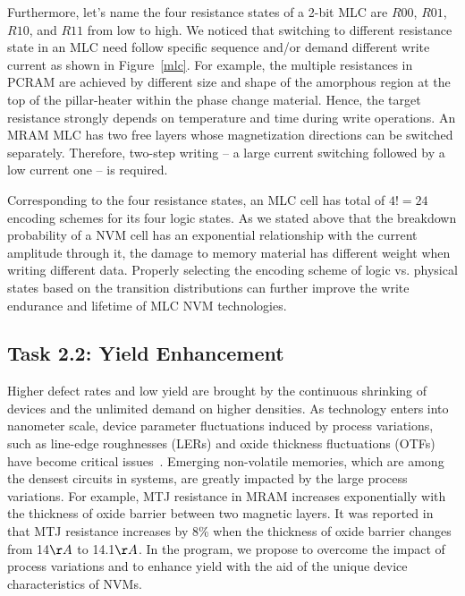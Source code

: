 Furthermore, let's name the four resistance states of a 2-bit MLC are $R00$, $R01$, $R10$, and $R11$ from low to high. We noticed that switching to different resistance state in an MLC need follow specific sequence and/or demand different write current as shown in Figure~\ref{mlc}. For example, the multiple resistances in PCRAM are achieved by different size and shape of the amorphous region at the top of the pillar-heater within the phase change material. Hence, the target resistance strongly depends on temperature and time during write operations. An MRAM MLC has two free layers whose magnetization directions can be switched separately. Therefore, two-step writing -- a large current switching followed by a low current one -- is required.

Corresponding to the four resistance states, an MLC cell has total of $4! = 24$ encoding schemes for its four logic states. As we stated above that the breakdown probability of a NVM cell has an exponential relationship with the current amplitude through it, the damage to memory material has different weight when writing different data. Properly selecting the encoding scheme of logic vs. physical states based on the transition distributions can further improve the write endurance and lifetime of MLC NVM technologies.

\subsection{Task 2.2: Yield Enhancement}
Higher defect rates and low yield are brought by the continuous shrinking of devices and the unlimited demand on higher densities. As technology enters into nanometer scale, device parameter fluctuations induced by process variations, such as line-edge roughnesses (LERs) and oxide thickness fluctuations (OTFs) have become critical issues~\cite{Asenov03}. Emerging non-volatile memories, which are among the densest circuits in systems, are greatly impacted by the large process variations. For example, MTJ resistance in MRAM increases exponentially with the thickness of oxide barrier between two magnetic layers. It was reported in~\cite{Tehrani00} that MTJ resistance increases by 8\% when the thickness of oxide barrier changes from 14${\AA}$ to 14.1${\AA}$. In the program, we propose to overcome the impact of process variations and to enhance yield with the aid of the unique device characteristics of NVMs.


